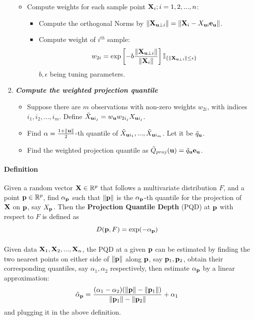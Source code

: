 \documentclass{article}
\begin{document}
\begin{enumerate}
\begin{itemize}
\item Compute weights for each sample point ${\mathbf{X}}_i; i=1,2,...,n$:

\begin{itemize}
\item Compute the orthogonal Norms by $\|{\mathbf{X}}_{{\bf{u}}\perp i}\|=\|{\mathbf{X}}_i-X_{{\bf{u}} i}{\bf{e}}_{\bf{u}}\|$.

\item Compute weight of $i^{th}$ sample:
$$w_{2i} = \exp\left[-b\frac{\|{\mathbf{X}}_{{\bf{u}}\perp i}\|}{\|{\mathbf{X}}_i\|}\right]\mathbb{I}_{\{\|{\mathbf{X}}_{{\bf{u}}\perp i}\|\leq\epsilon\}}$$
$b,\epsilon$ being tuning parameters.
\end{itemize}
\end{itemize} 

\item \textit{\textbf{Compute the weighted projection quantile}}
\begin{itemize}
\item Suppose there are $m$ observations with non-zero weights $w_{2i}$, with indices $i_1,i_2,...,i_m$. Define $\tilde X_{{\bf{u}} i_j} = w_{\bf{u}} w_{2i_j}X_{{\bf{u}} i_j}$.
\item Find $\alpha=\frac{1+\|{\bf{u}}\|}{2}$-th quantile of $\tilde X_{{\bf{u}} i_1},...,\tilde X_{{\bf{u}} i_m}$. Let it be $\tilde q_{\bf{u}}$.
\item Find the weighted projection quantile as $\tilde Q_{proj}({\bf{u}})=\tilde q_{\bf{u}}{\bf{e}}_{\bf{u}}$.
\end{itemize}
\end{enumerate}
\newpage

\paragraph{Definition} Given a random vector ${\mathbf{X}}\in \mathbb{R}^p$ that follows a multivariate distribution $F$, and a point ${\bf{p}}\in\mathbb{R}^p$, find $\alpha_{\bf{p}}$ such that $\|{\bf{p}}\|$ is the $\alpha_{\bf{p}}$-th quantile for the projection of ${\mathbf{X}}$ on ${\bf{p}}$, say $X_{\bf{p}}$. Then the \textbf{Projection Quantile Depth} (PQD) at ${\bf{p}}$ with respect to $F$ is defined as
$$ D({\bf{p}}, F) = \exp(-\alpha_{\bf{p}}) $$

\paragraph{} Given data ${\mathbf{X}}_1,{\mathbf{X}}_2,...,{\mathbf{X}}_n$, the PQD at a given ${\bf{p}}$ can be estimated by finding the two nearest points on either side of $\|{\bf{p}}\|$ along ${\bf{p}}$, say ${\bf{p}}_1, {\bf{p}}_2$, obtain their corresponding quantiles, say $\alpha_1, \alpha_2$ respectively, then estimate $\alpha_{\bf{p}}$ by a linear approximation:
$$\hat\alpha_{\bf{p}}=\frac{(\alpha_1-\alpha_2)(\|{\bf{p}}\|-\|{\bf{p}}_1\|)}{\|{\bf{p}}_1\|-\|{\bf{p}}_2\|}+\alpha_1$$
and plugging it in the above definition.
\end{document}
